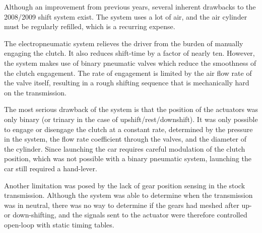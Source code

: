Although an improvement from previous years, several inherent drawbacks to the 2008/2009 shift system exist. The system uses a lot of air, and the air cylinder must be regularly refilled, which is a recurring expense.

The electropneumatic system relieves the driver from the burden of manually engaging the clutch. It also reduces shift-time by a factor of nearly ten. However, the system makes use of binary pneumatic valves which reduce the smoothness of the clutch engagement. The rate of engagement is limited by the air flow rate of the valve itself, resulting in a rough shifting sequence that is mechanically hard on the transmission. 

The most serious drawback of the system is that the position of the actuators was only binary (or trinary in the case of upshift/rest/downshift). It was only possible to engage or disengage the clutch at a constant rate, determined by the pressure in the system, the flow rate coefficient through the valves, and the diameter of the cylinder. Since launching the car requires careful modulation of the clutch position, which was not possible with a binary pneumatic system, launching the car still required a hand-lever.

Another limitation was posed by the lack of gear position sensing in the stock transmission. Although the system was able to determine when the transmission was in neutral, there was no way to determine if the gears had meshed after up- or down-shifting, and the signals sent to the actuator were therefore controlled open-loop with static timing tables.
